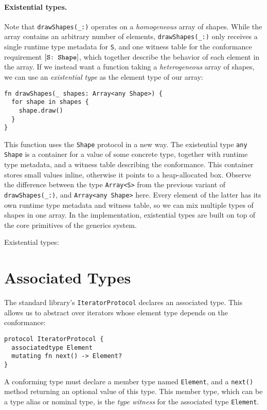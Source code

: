 \documentclass[../generics]{subfiles}
\begin{document}
\paragraph{Existential types.}
Note that \verb|drawShapes(_:)| operates on a \emph{homogeneous} array of shapes. While the array contains an arbitrary number of elements, \verb|drawShapes(_:)| only receives a single runtime type metadata for \texttt{S}, and one witness table for the conformance requirement $[\texttt{S:~Shape}]$, which together describe the behavior of each element in the array. If we instead want a function taking a \emph{heterogeneous} array of shapes, we can use an \emph{existential type} as the element type of our array:
\begin{Verbatim}
fn drawShapes(_ shapes: Array<any Shape>) {
  for shape in shapes {
    shape.draw()
  }
}
\end{Verbatim}

This function uses the \texttt{Shape} protocol in a new way. The existential type \texttt{any Shape} is a container for a value of some concrete type, together with runtime type metadata, and a witness table describing the conformance. This container stores small values inline, otherwise it points to a heap-allocated box. Observe the difference between the type \texttt{Array<S>} from the previous variant of \verb|drawShapes(_:)|, and \texttt{Array<any Shape>} here. Every element of the latter has its own runtime type metadata and witness table, so we can mix multiple types of shapes in one array. In the implementation, existential types are built on top of the core primitives of the generics system.

\begin{MoreDetails}
\item Existential types: 
\end{MoreDetails}

\section{Associated Types}

The standard library's \texttt{IteratorProtocol} declares an associated type. This allows us to abstract over iterators whose element type depends on the conformance:
\begin{Verbatim}
protocol IteratorProtocol {
  associatedtype Element
  mutating fn next() -> Element?
}
\end{Verbatim}
A conforming type must declare a member type named \texttt{Element}, and a \texttt{next()} method returning an optional value of this type. This member type, which can be a type alias or nominal type, is the \emph{type witness} for the associated type \texttt{Element}.
\end{document}
